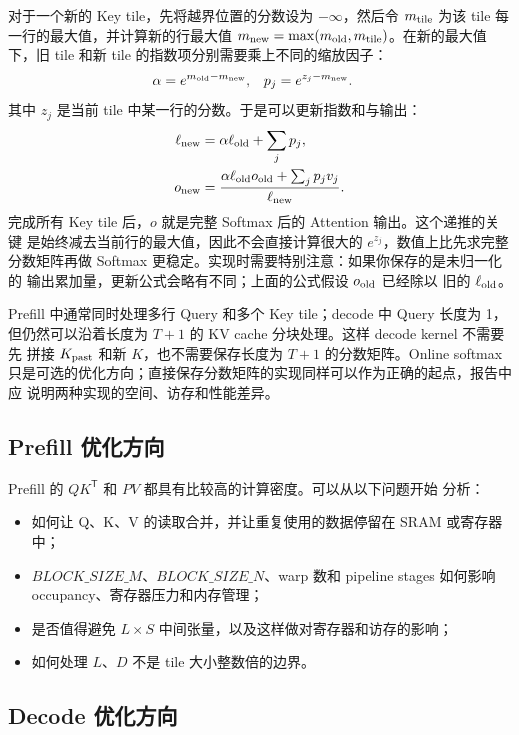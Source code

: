 \documentclass{article}
\begin{document}
对于一个新的 Key tile，先将越界位置的分数设为 $-\infty$，然后令
$m_{\rm tile}$ 为该 tile 每一行的最大值，并计算新的行最大值
$m_{\rm new}=\max(m_{\rm old},m_{\rm tile})$。在新的最大值下，旧 tile 和新 tile
的指数项分别需要乘上不同的缩放因子：
\begin{align}
  \alpha &= e^{m_{\rm old}-m_{\rm new}},
  &p_j &= e^{z_j-m_{\rm new}}.
\end{align}
其中 $z_j$ 是当前 tile 中某一行的分数。于是可以更新指数和与输出：
\begin{align}
  \ell_{\rm new} &= \alpha\ell_{\rm old}+\sum_j p_j,\\
  o_{\rm new} &=
  \frac{\alpha\ell_{\rm old}o_{\rm old}+\sum_j p_jv_j}
       {\ell_{\rm new}}.
\end{align}
完成所有 Key tile 后，$o$ 就是完整 Softmax 后的 Attention 输出。这个递推的关键
是始终减去当前行的最大值，因此不会直接计算很大的 $e^{z_j}$，数值上比先求完整
分数矩阵再做 Softmax 更稳定。实现时需要特别注意：如果你保存的是未归一化的
输出累加量，更新公式会略有不同；上面的公式假设 $o_{\rm old}$ 已经除以
旧的 $\ell_{\rm old}$。

Prefill 中通常同时处理多行 Query 和多个 Key tile；decode 中 Query 长度为 1，
但仍然可以沿着长度为 $T+1$ 的 KV cache 分块处理。这样 decode kernel 不需要先
拼接 $K_{\rm past}$ 和新 $K$，也不需要保存长度为 $T+1$ 的分数矩阵。Online softmax
只是可选的优化方向；直接保存分数矩阵的实现同样可以作为正确的起点，报告中应
说明两种实现的空间、访存和性能差异。

\subsection{Prefill 优化方向}

Prefill 的 $QK^\mathsf{T}$ 和 $PV$ 都具有比较高的计算密度。可以从以下问题开始
分析：
\begin{itemize}[leftmargin=2.5em]
  \item 如何让 Q、K、V 的读取合并，并让重复使用的数据停留在 SRAM 或寄存器中；
  \item $BLOCK\_SIZE\_M$、$BLOCK\_SIZE\_N$、warp 数和 pipeline stages 如何影响
        occupancy、寄存器压力和内存管理；
  \item 是否值得避免 $L\times S$ 中间张量，以及这样做对寄存器和访存的影响；
  \item 如何处理 $L$、$D$ 不是 tile 大小整数倍的边界。
\end{itemize}

\subsection{Decode 优化方向}
\end{document}
